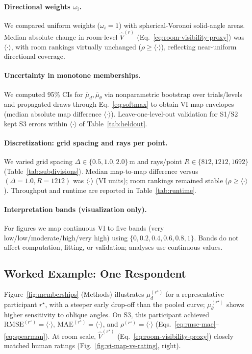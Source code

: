 \documentclass[final,3p,times,review]{elsarticle}
\begin{document}
\paragraph{Directional weights $\omega_i$.}
We compared uniform weights ($\omega_i{=}1$) with spherical-Voronoi solid-angle areas. Median absolute change in room-level $\widehat{V}^{(r)}$ (Eq.~\eqref{eq:room-visibility-proxy}) was $\langle\cdot\rangle$, with room rankings virtually unchanged ($\rho\ge\langle\cdot\rangle$), reflecting near-uniform directional coverage.

\paragraph{Uncertainty in monotone memberships.}
We computed 95\% CIs for $\bar{\mu}_d,\bar{\mu}_\theta$ via nonparametric bootstrap over trials/levels and propagated draws through Eq.~\eqref{eq:softmax} to obtain VI map envelopes (median absolute map difference $\langle\cdot\rangle$). Leave-one-level-out validation for S1/S2 kept S3 errors within $\langle\cdot\rangle$ of Table~\ref{tab:heldout}.

\paragraph{Discretization: grid spacing and rays per point.}
We varied grid spacing $\Delta\in\{0.5,1.0,2.0\}$\,m and rays/point $R\in\{812,1212,1692\}$ (Table~\ref{tab:subdivisions}). Median map-to-map difference versus $(\Delta{=}1.0,R{=}1212)$ was $\langle\cdot\rangle$ (VI units); room rankings remained stable ($\rho\ge\langle\cdot\rangle$). Throughput and runtime are reported in Table~\ref{tab:runtime}.

\paragraph{Interpretation bands (visualization only).}
For figures we map continuous $\mathrm{VI}$ to five bands (very low/low/moderate/high/very high) using $\{0,0.2,0.4,0.6,0.8,1\}$. Bands do not affect computation, fitting, or validation; analyses use continuous values.

\subsection{Worked Example: One Respondent}
Figure~\ref{fig:memberships} (Methods) illustrates $\mu_d^{(r^\star)}$ for a representative participant $r^\star$, with a steeper early drop-off than the pooled curve; $\mu_\theta^{(r^\star)}$ shows higher sensitivity to oblique angles. On S3, this participant achieved $\mathrm{RMSE}^{(r^\star)}{=}\langle \cdot \rangle$, $\mathrm{MAE}^{(r^\star)}{=}\langle \cdot \rangle$, and $\rho^{(r^\star)}{=}\langle \cdot \rangle$ (Eqs.~\ref{eq:rmse-mae}--\ref{eq:spearman}). At room scale, $\widehat{V}^{(r^\star)}$ (Eq.~\ref{eq:room-visibility-proxy}) closely matched human ratings (Fig.~\ref{fig:vi-map-vs-rating}, right).
\end{document}
